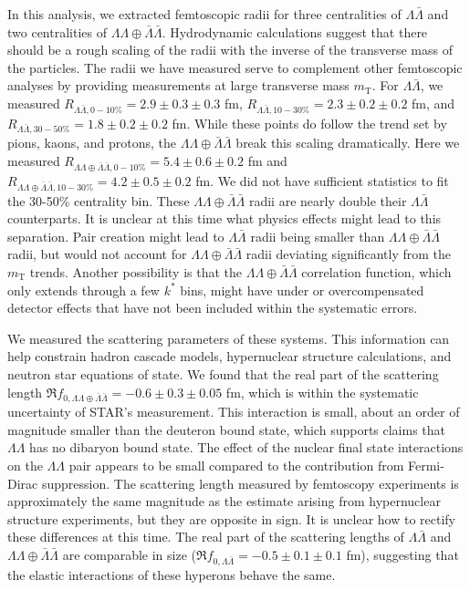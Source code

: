 In this analysis, we extracted femtoscopic radii for three centralities of $\Lambda\bar{\Lambda}$ and two centralities of $\Lambda\Lambda\oplus\bar{\Lambda}\bar{\Lambda}$.
Hydrodynamic calculations suggest that there should be a rough scaling of the radii with the inverse of the transverse mass of the particles.
The radii we have measured serve to complement other femtoscopic analyses by providing measurements at large transverse mass $m_\mathrm{T}$.
For $\Lambda\bar{\Lambda}$, we measured $R_{\Lambda\bar{\Lambda},0-10\%} = 2.9\pm 0.3 \pm 0.3$ fm, $R_{\Lambda\bar{\Lambda},10-30\%} = 2.3\pm 0.2 \pm 0.2$ fm, and $R_{\Lambda\bar{\Lambda},30-50\%} = 1.8\pm 0.2 \pm 0.2$ fm. 
While these points do follow the trend set by pions, kaons, and protons, the $\Lambda\Lambda\oplus\bar{\Lambda}\bar{\Lambda}$ break this scaling dramatically.
Here we measured $R_{\Lambda\Lambda\oplus\bar{\Lambda}\bar{\Lambda}, 0-10\%} = 5.4 \pm 0.6 \pm 0.2$ fm and  $R_{\Lambda\Lambda\oplus\bar{\Lambda}\bar{\Lambda}, 10-30\%} = 4.2 \pm 0.5 \pm 0.2$ fm.
We did not have sufficient statistics to fit the 30-50\% centrality bin.
These $\Lambda\Lambda\oplus\bar{\Lambda}\bar{\Lambda}$ radii are nearly double their $\Lambda\bar{\Lambda}$ counterparts.
It is unclear at this time what physics effects might lead to this separation.
Pair creation might lead to $\Lambda\bar{\Lambda}$ radii being smaller than $\Lambda\Lambda\oplus\bar{\Lambda}\bar{\Lambda}$ radii, but would not account for $\Lambda\Lambda\oplus\bar{\Lambda}\bar{\Lambda}$ radii deviating significantly from the $m_\mathrm{T}$ trends.
Another possibility is that the $\Lambda\Lambda\oplus\bar{\Lambda}\bar{\Lambda}$ correlation function, which only extends through a few $k^*$ bins, might have under or overcompensated detector effects that have not been included within the systematic errors.

We measured the scattering parameters of these systems. This information can help constrain hadron cascade models, hypernuclear structure calculations, and neutron star equations of state.
We found that the real part of the scattering length $\Re f_{0,\Lambda\Lambda\oplus\bar{\Lambda}\bar{\Lambda}} = -0.6 \pm 0.3 \pm 0.05$ fm, which is within the systematic uncertainty of STAR's measurement.
This interaction is small, about an order of magnitude smaller than the deuteron bound state, which supports claims that $\Lambda\Lambda$ has no dibaryon bound state.
The effect of the nuclear final state interactions on the $\Lambda\Lambda$ pair appears to be small compared to the contribution from Fermi-Dirac suppression.
The scattering length measured by femtoscopy experiments is approximately the same magnitude as the estimate arising from hypernuclear structure experiments, but they are opposite in sign.
It is unclear how to rectify these differences at this time.
The real part of the scattering lengths of $\Lambda\bar{\Lambda}$ and $\Lambda\Lambda\oplus\bar{\Lambda}\bar{\Lambda}$ are comparable in size ($\Re f_{0,\Lambda\bar{\Lambda}} = -0.5 \pm 0.1 \pm 0.1$ fm), suggesting that the elastic interactions of these hyperons behave the same.

